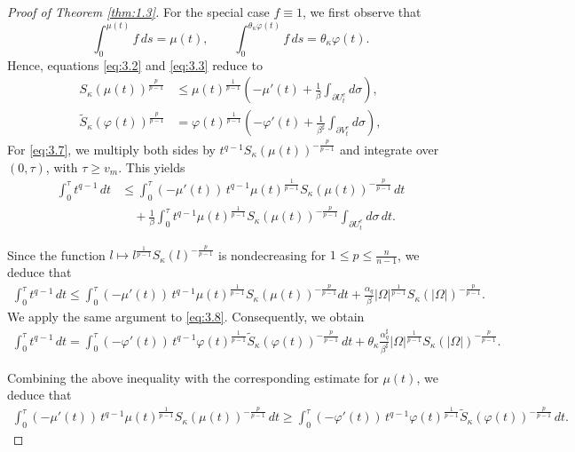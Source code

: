\documentclass[11pt]{article}
\numberwithin{equation}{section}
\theoremstyle{definition}
\theoremstyle{remark}
\begin{document}
\begin{proof}[Proof of Theorem \ref{thm:1.3}]
  For the special case $f\equiv 1$, we first observe that
\[
\int_0^{\mu(t)} f\, ds = \mu(t), 
\qquad 
\int_0^{\theta_\kappa \varphi(t)} f\, ds = \theta_\kappa \varphi(t).
\]
Hence, equations \eqref{eq:3.2} and \eqref{eq:3.3} reduce to
\begin{align}
S_\kappa(\mu(t))^{\frac{p}{p-1}}
&\le
\mu(t)^{\frac{1}{p-1}}
\left(-\mu'(t)+\frac{1}{\beta}\int_{\partial U_t^e} d\sigma\right),
\label{eq:3.7}
\\
\tilde S_\kappa(\varphi(t))^{\frac{p}{p-1}}
&=
\varphi(t)^{\frac{1}{p-1}}
\left(-\varphi'(t)+\frac{1}{\beta^\sharp}\int_{\partial V_t^e} d\sigma\right),
\label{eq:3.8}
\end{align}
For \eqref{eq:3.7}, we multiply both sides by
$t^{q-1} S_\kappa(\mu(t))^{-\frac{p}{p-1}}$
and integrate over $(0,\tau)$, with $\tau \ge v_m$. This yields
\begin{align*}
\int_0^\tau t^{q-1}\,dt
&\le
\int_0^\tau (-\mu'(t))\, t^{q-1}\mu(t)^{\frac{1}{p-1}}
S_\kappa(\mu(t))^{-\frac{p}{p-1}}\,dt
\nonumber\\
&\quad +
\frac{1}{\beta}
\int_0^\tau t^{q-1}\mu(t)^{\frac{1}{p-1}}
S_\kappa(\mu(t))^{-\frac{p}{p-1}}
\int_{\partial U_t^e} d\sigma\, dt.
\end{align*}

Since the function
$l \mapsto l^{\frac{1}{p-1}} S_\kappa(l)^{-\frac{p}{p-1}}$
is nondecreasing for $1 \le p \le \frac{n}{n-1}$, we deduce that
\begin{align*}
\int_0^\tau t^{q-1}\,dt
\le
\int_0^\tau (-\mu'(t))\, t^{q-1}\mu(t)^{\frac{1}{p-1}}
S_\kappa(\mu(t))^{-\frac{p}{p-1}}dt
+
\frac{\alpha_q}{\beta}
|\Omega|^{\frac{1}{p-1}}
S_\kappa(|\Omega|)^{-\frac{p}{p-1}}.
\end{align*}
We apply the same argument to \eqref{eq:3.8}. Consequently, we obtain
\begin{align*}
\int_0^\tau t^{q-1}\,dt
=
\int_0^\tau (-\varphi'(t))\, t^{q-1}\varphi(t)^{\frac{1}{p-1}}
\tilde{S}_\kappa(\varphi(t))^{-\frac{p}{p-1}}\,dt
+\theta_\kappa\frac{\alpha_q^\sharp}{\beta^\sharp}
|\Omega|^{\frac{1}{p-1}}
S_\kappa(|\Omega|)^{-\frac{p}{p-1}}.
\end{align*}

Combining the above inequality with the corresponding estimate for $\mu(t)$, we deduce that
\begin{align*}
\int_0^\tau (-\mu'(t))\,t^{q-1}\mu(t)^{\frac{1}{p-1}}
S_\kappa(\mu(t))^{-\frac{p}{p-1}}\,dt
\ge
\int_0^\tau (-\varphi'(t))\,t^{q-1}\varphi(t)^{\frac{1}{p-1}}
\tilde{S}_\kappa(\varphi(t))^{-\frac{p}{p-1}}\,dt.
\end{align*}


\end{proof}
\end{document}
